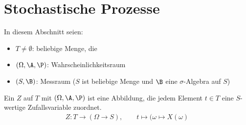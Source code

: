 \section{Stochastische Prozesse}
In diesem Abschnitt seien:
\begin{itemize}
	\item $T\neq\emptyset$: beliebige Menge, die 
	\item $(\Omega,\A,\P)$: Wahrscheinlichkeitsraum
	\item $(S,\B)$: Messraum ($S$ ist beliebige Menge und $\B$ eine $\sigma$-Algebra auf $S$)
\end{itemize}

\begin{definition}\label{def1.3.1}
	Ein 
	$Z$ auf $T$ mit 
	$(\Omega,\A,\P)$ ist eine Abbildung, die jedem Element $t\in T$ eine $S$-wertige Zufallsvariable zuordnet.
	\begin{align*}
		Z\colon T\to(\Omega\to S),\qquad t\mapsto(\omega\mapsto X(\omega)
	\end{align*}
\end{definition}

